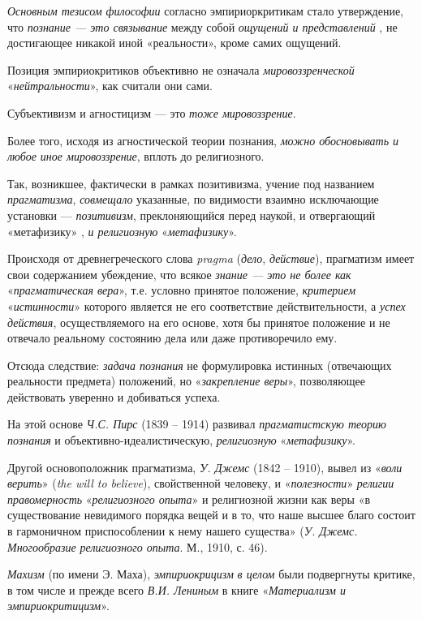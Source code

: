 \documentclass[a4paper,14pt,russian]{extreport}
\begin{document}
\emph{Основным тезисом философии} согласно эмпириоркритикам стало утверждение, что \emph{познание --- это связывание} между собой \emph{ощущений и представлений} , не достигающее никакой иной «реальности», кроме самих ощущений.

Позиция эмпириокритиков объективно не означала \emph{мировоззренческой} «\emph{нейтральности}», как считали они сами.

Субъективизм и агностицизм --- это \emph{тоже мировоззрение}.

Более того, исходя из агностической теории познания, \emph{можно обосновывать и любое иное мировоззрение}, вплоть до религиозного.

Так, возникшее, фактически в рамках позитивизма, учение под названием \emph{прагматизма}, \emph{совмещало} указанные, по видимости взаимно исключающие установки --- \emph{позитивизм}, преклоняющийся перед наукой, и отвергающий «метафизику» , \emph{и религиозную} «\emph{метафизику}».

Происходя от древнегреческого слова \emph{pragma} (\emph{дело}, \emph{действие}), прагматизм имеет свои содержанием убеждение, что всякое \emph{знание --- это не более как} «\emph{прагматическая вера}», т.е. условно принятое положение, \emph{критерием} «\emph{истинности}» которого является не его соответствие действительности, а \emph{успех действия}, осуществляемого на его основе, хотя бы принятое положение и не отвечало реальному состоянию дела или даже противоречило ему.

Отсюда следствие: \emph{задача познания} не формулировка истинных (отвечающих реальности предмета) положений, но «\emph{закрепление веры}», позволяющее действовать уверенно и добиваться успеха.

На этой основе \emph{Ч.С. Пирс} (1839 -- 1914) развивал \emph{прагматистскую теорию познания} и объективно-идеалистическую, \emph{религиозную} «\emph{метафизику}».

Другой основоположник прагматизма, \emph{У. Джемс} (1842 -- 1910), вывел из «\emph{воли верить}» (\emph{the will to believe}), свойственной человеку, и «\emph{полезности}» \emph{религии} \emph{правомерность} «\emph{религиозного опыта}» и религиозной жизни как веры «в существование невидимого порядка вещей и в то, что наше высшее благо состоит в гармоничном приспособлении к нему нашего существа» (\emph{У. Джемс. Многообразие религиозного опыта}. М., 1910, с. 46).

\emph{Махизм} (по имени Э. Маха), \emph{эмпириокрицизм} \emph{в целом} были подвергнуты критике, в том числе и прежде всего \emph{В.И. Лениным} в книге «\emph{Материализм и эмпириокритицизм}».
\end{document}
